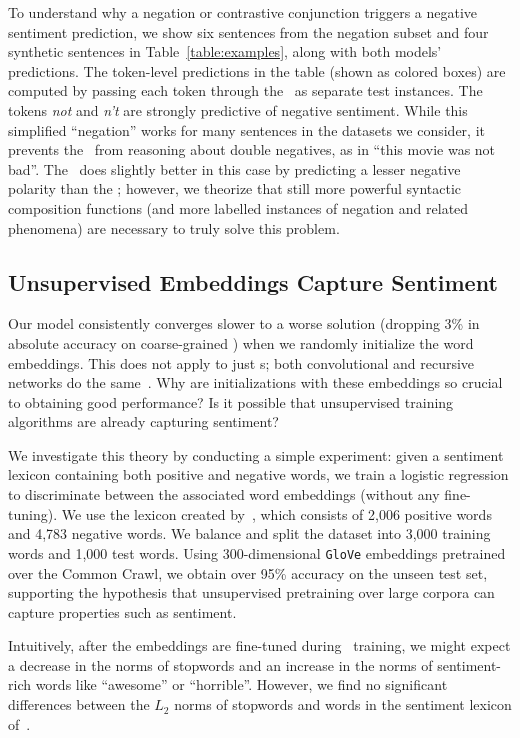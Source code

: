 To understand why a negation or contrastive conjunction triggers a negative
sentiment prediction, we show six sentences from the negation subset and four
synthetic sentences in Table~\ref{table:examples}, along with both models'
predictions. The token-level predictions in the table (shown as colored boxes)
are computed by passing each token through the \dan\ as separate test
instances.  The tokens \emph{not} and \emph{n't} are strongly predictive of
negative sentiment. While this simplified ``negation'' works for many
sentences in the datasets we consider, it prevents the \dan\ from reasoning
about double negatives, as in ``this movie was not bad''. The \drnn\ does
slightly better in this case by predicting a lesser negative polarity than the
\dan; however, we theorize that still more powerful syntactic composition
functions (and more labelled instances of negation and related phenomena) are
necessary to truly solve this problem.

























\subsection{Unsupervised Embeddings Capture Sentiment}

Our model consistently converges slower to a worse solution (dropping 3\% in
absolute accuracy on coarse-grained ) when we randomly initialize the
word embeddings. This does not apply to just \dan s; both convolutional and
recursive networks do the same~\cite{kim:2014:EMNLP2014,irsoy-drsv}. Why are
initializations with these embeddings so crucial to obtaining good performance?
Is it possible that unsupervised training algorithms are already capturing
sentiment?

We investigate this theory by conducting a simple experiment: given a sentiment
lexicon containing both positive and negative words, we train a logistic
regression to discriminate between the associated word embeddings (without any
fine-tuning). We use the lexicon created by~, which
consists of 2,006 positive words and 4,783 negative words. We balance and split
the dataset into 3,000 training words and 1,000 test words. Using
300-dimensional \texttt{GloVe} embeddings pretrained over the Common Crawl, we
obtain over 95\% accuracy on the unseen test set, supporting the hypothesis that
unsupervised pretraining over large corpora can capture properties such as
sentiment.

Intuitively, after the embeddings are fine-tuned during \dan\ training, we might
expect a decrease in the norms of stopwords and an increase in the norms of
sentiment-rich words like ``awesome'' or ``horrible''. However, we find no
significant differences between the $L_2$ norms of stopwords and words in the
sentiment lexicon of~.
